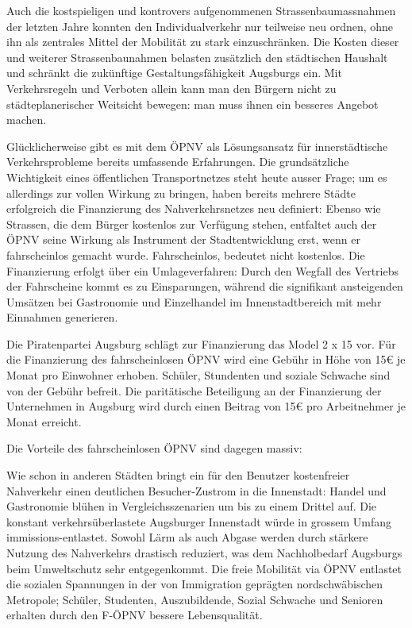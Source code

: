   Auch die kostspieligen und kontrovers aufgenommenen Strassenbaumassnahmen 
  der letzten Jahre konnten den Individualverkehr nur teilweise neu ordnen, 
  ohne ihn als zentrales Mittel der Mobilität zu stark einzuschränken. Die 
  Kosten dieser und weiterer Strassenbaunahmen belasten zusätzlich den 
  städtischen Haushalt und schränkt die zukünftige Gestaltungsfähigkeit 
  Augsburgs ein. Mit Verkehrsregeln und Verboten allein kann man den Bürgern 
  nicht zu städteplanerischer Weitsicht bewegen: man muss ihnen ein besseres 
  Angebot machen.
  
  Glücklicherweise gibt es mit dem ÖPNV als Lösungsansatz für innerstädtische 
  Verkehrsprobleme bereits umfassende Erfahrungen. Die grundsätzliche 
  Wichtigkeit eines öffentlichen Transportnetzes steht heute ausser Frage; um 
  es allerdings zur vollen Wirkung zu bringen, haben bereits mehrere Städte 
  erfolgreich die Finanzierung des Nahverkehrsnetzes neu definiert: Ebenso wie 
  Strassen, die dem Bürger kostenlos zur Verfügung stehen, entfaltet auch der 
  ÖPNV seine Wirkung als Instrument der Stadtentwicklung erst, wenn er 
  fahrscheinlos gemacht wurde. Fahrscheinlos, bedeutet nicht kostenlos. Die 
  Finanzierung erfolgt über ein Umlageverfahren: Durch den Wegfall des 
  Vertriebs der Fahrscheine kommt es zu Einsparungen, während die signifikant 
  ansteigenden Umsätzen bei Gastronomie und Einzelhandel im Innenstadtbereich 
  mit mehr Einnahmen generieren.
  
  Die Piratenpartei Augsburg schlägt zur Finanzierung das Model 2 x 15 vor. 
  Für die Finanzierung des fahrscheinlosen ÖPNV wird eine Gebühr in Höhe von 
  15€ je Monat pro Einwohner erhoben. Schüler, Stundenten und soziale Schwache 
  sind von der Gebühr befreit. Die paritätische Beteiligung an der 
  Finanzierung der Unternehmen in Augsburg wird durch einen Beitrag von 15€ 
  pro Arbeitnehmer je Monat erreicht.
  
  Die Vorteile des fahrscheinlosen ÖPNV sind dagegen massiv:
  
  Wie schon in anderen Städten bringt ein für den Benutzer kostenfreier 
  Nahverkehr einen deutlichen Besucher-Zustrom in die Innenstadt: Handel und 
  Gastronomie blühen in Vergleichsszenarien um bis zu einem Drittel auf. Die 
  konstant verkehrsüberlastete Augsburger Innenstadt würde in grossem Umfang 
  immissions-entlastet. Sowohl Lärm als auch Abgase werden durch stärkere 
  Nutzung des Nahverkehrs drastisch reduziert, was dem Nachholbedarf Augsburgs 
  beim Umweltschutz sehr entgegenkommt. Die freie Mobilität via ÖPNV entlastet 
  die sozialen Spannungen in der von Immigration geprägten nordschwäbischen 
  Metropole; Schüler, Studenten, Auszubildende, Sozial Schwache und Senioren 
  erhalten durch den F-ÖPNV bessere Lebensqualität.
  
